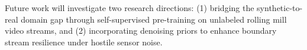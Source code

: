 \documentclass{ieeeaccess}
\begin{document}
Future work will investigate two research directions: (1) bridging the synthetic-to-real domain gap through self-supervised pre-training on unlabeled rolling mill video streams, and (2) incorporating denoising priors to enhance boundary stream resilience under hostile sensor noise.




\EOD
\end{document}
